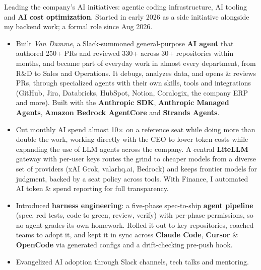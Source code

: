 \documentclass[10pt]{cv}
\newcommand{\kw}[1]{\textbf{#1}}
\begin{document}

    \begin{flushleft}



        Leading the company's AI initiatives: agentic coding infrastructure, AI tooling and \kw{AI cost optimization}.
        Started in early 2026 as a side initiative alongside my backend work; a formal role since Aug 2026.
        \begin{itemize}
            \item Built \emph{Van Damme}, a Slack-summoned general-purpose \kw{AI agent} that authored 250+ PRs and reviewed 330+
                  across 30+ repositories within months, and became part of everyday work in almost every department, from R\&D to Sales
                  and Operations. It debugs, analyzes data,
                  and opens \& reviews PRs, through specialized agents with their own skills, tools and integrations
                  (GitHub, Jira, Databricks, HubSpot, Notion, Coralogix, the company ERP and more). Built with the \kw{Anthropic SDK},
                  \kw{Anthropic Managed Agents}, \kw{Amazon Bedrock AgentCore} and \kw{Strands Agents}.
            \item Cut monthly AI spend almost 10$\times$ on a reference seat while doing more than double the work, working directly with the CEO
                  to lower token costs while expanding the use of LLM agents across the company. A central \kw{LiteLLM} gateway with per-user keys
                  routes the grind to cheaper models from a diverse set of providers (xAI Grok, valarhq.ai, Bedrock) and keeps frontier models
                  for judgment, backed by a seat policy across tools. With Finance, I automated AI token \& spend reporting for full transparency.
            \item Introduced \kw{harness engineering}: a five-phase spec-to-ship \kw{agent pipeline} (spec, red tests, code to green, review, verify)
                  with per-phase permissions, so no agent grades its own homework. Rolled it out to key repositories, coached teams to adopt it,
                  and kept it in sync across \kw{Claude Code}, \kw{Cursor} \& \kw{OpenCode} via generated configs and a drift-checking pre-push hook.
            \item Evangelized AI adoption through Slack channels, tech talks and mentoring.
        \end{itemize}


\end{flushleft}
\end{document}
